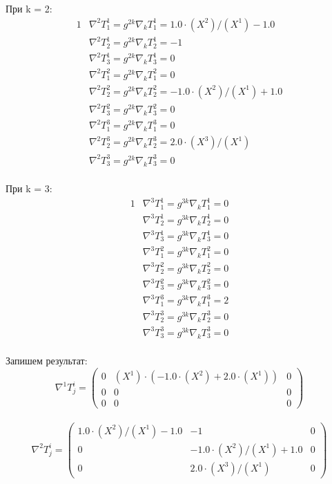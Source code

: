 \documentclass{article}
\begin{document}
При k = 2:\\
\begin{alignat*}{1}
  & \nabla^2T^1_1 = g^{2k}\nabla_kT^1_1 = 1.0\cdot (X^2)/(X^1) - 1.0 \\
  & \nabla^2T^1_2 = g^{2k}\nabla_kT^1_2 = -1 \\
  & \nabla^2T^1_3 = g^{2k}\nabla_kT^1_3 = 0 \\
  & \nabla^2T^2_1 = g^{2k}\nabla_kT^2_1 = 0 \\
  & \nabla^2T^2_2 = g^{2k}\nabla_kT^2_2 = -1.0\cdot (X^2)/(X^1) + 1.0 \\
  & \nabla^2T^2_3 = g^{2k}\nabla_kT^2_3 = 0 \\
  & \nabla^2T^3_1 = g^{2k}\nabla_kT^3_1 = 0 \\
  & \nabla^2T^3_2 = g^{2k}\nabla_kT^3_2 = 2.0\cdot (X^3)/(X^1) \\
  & \nabla^2T^3_3 = g^{2k}\nabla_kT^3_3 = 0 
\end{alignat*}\\
При k = 3:\\
\begin{alignat*}{1}
  & \nabla^3T^1_1 = g^{3k}\nabla_kT^1_1 = 0 \\
  & \nabla^3T^1_2 = g^{3k}\nabla_kT^1_2 = 0 \\
  & \nabla^3T^1_3 = g^{3k}\nabla_kT^1_3 = 0 \\
  & \nabla^3T^2_1 = g^{3k}\nabla_kT^2_1 = 0 \\
  & \nabla^3T^2_2 = g^{3k}\nabla_kT^2_2 = 0 \\
  & \nabla^3T^2_3 = g^{3k}\nabla_kT^2_3 = 0 \\
  & \nabla^3T^3_1 = g^{3k}\nabla_kT^3_1 = 2 \\
  & \nabla^3T^3_2 = g^{3k}\nabla_kT^3_2 = 0 \\
  & \nabla^3T^3_3 = g^{3k}\nabla_kT^3_3 = 0 
\end{alignat*}\\
Запишем результат:\\
\[
\nabla^1T^i_j = \begin{pmatrix}
	0 & (X^1)\cdot (-1.0\cdot (X^2) + 2.0\cdot (X^1)) & 0\\
	0 & 0 & 0\\
	0 & 0 & 0
\end{pmatrix}
\]\\
\[
\nabla^2T^i_j = \begin{pmatrix}
	1.0\cdot (X^2)/(X^1) - 1.0 & -1 & 0\\
	0 & -1.0\cdot (X^2)/(X^1) + 1.0 & 0\\
	0 & 2.0\cdot (X^3)/(X^1) & 0
\end{pmatrix}
\]\\
\end{document}
